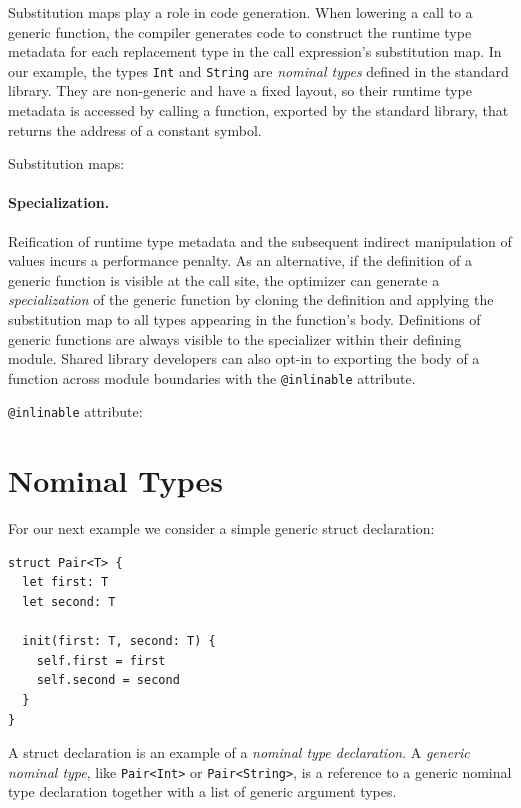 \documentclass[../generics]{subfiles}
\begin{document}
Substitution maps play a role in code generation. When lowering a call to a generic function, the compiler generates code to construct the runtime type metadata for each replacement type in the call expression's substitution map. In our example, the types \texttt{Int} and \texttt{String} are \emph{nominal types} defined in the standard library. They are non-generic and have a fixed layout, so their runtime type metadata is accessed by calling a function, exported by the standard library, that returns the address of a constant symbol.

\begin{MoreDetails}
\item Substitution maps: 
\end{MoreDetails}

\paragraph{Specialization.} Reification of runtime type metadata and the subsequent indirect manipulation of values incurs a performance penalty. As an alternative, if the definition of a generic function is visible at the call site, the optimizer can generate a \emph{specialization} of the generic function by cloning the definition and applying the substitution map to all types appearing in the function's body. Definitions of generic functions are always visible to the specializer within their defining module. Shared library developers can also opt-in to exporting the body of a function across module boundaries with the \texttt{@inlinable} attribute.

\begin{MoreDetails}
\item \texttt{@inlinable} attribute: 
\end{MoreDetails}

\section{Nominal Types}

For our next example we consider a simple generic struct declaration:
\begin{Verbatim}
struct Pair<T> {
  let first: T
  let second: T

  init(first: T, second: T) {
    self.first = first
    self.second = second
  }
}
\end{Verbatim}
A struct declaration is an example of a \emph{nominal type declaration}. A \emph{generic nominal type}, like \texttt{Pair<Int>} or \texttt{Pair<String>}, is a reference to a generic nominal type declaration together with a list of generic argument types.
\end{document}
